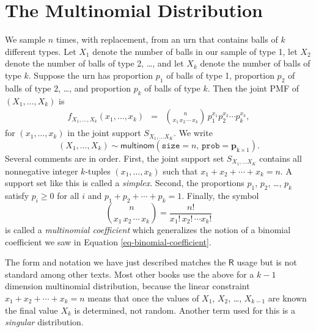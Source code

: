 \section{The Multinomial Distribution}
\label{sec-7-9}

We sample \(n\) times, with replacement, from an urn that contains
balls of \(k\) different types. Let \(X_{1}\) denote the number of
balls in our sample of type 1, let \(X_{2}\) denote the number of
balls of type 2, \ldots{}, and let \(X_{k}\) denote the number of balls of
type \(k\). Suppose the urn has proportion \(p_{1}\) of balls of type
1, proportion \(p_{2}\) of balls of type 2, \ldots{}, and proportion
\(p_{k}\) of balls of type \(k\). Then the joint PMF of
\((X_{1},\ldots,X_{k})\) is
\begin{eqnarray}
f_{X_{1},\ldots,X_{k}}(x_{1},\ldots,x_{k}) & = & {n \choose x_{1}\, x_{2}\,\cdots\, x_{k}}\, p_{1}^{x_{1}}p_{2}^{x_{2}}\cdots p_{k}^{x_{k}},
\end{eqnarray}
for \((x_{1},\ldots,x_{k})\) in the joint support \(S_{X_{1},\ldots X_{K}}\). We write
\begin{equation}
(X_{1},\ldots,X_{k})\sim\mathsf{multinom}(\mathtt{size}=n,\,\mathtt{prob}=\mathbf{p}_{\mathrm{k}\times1}).
\end{equation}
Several comments are in order. First, the joint support set
\(S_{X_{1},\ldots X_{K}}\) contains all nonnegative integer
\(k\)-tuples \((x_{1},\ldots,x_{k})\) such that
\(x_{1}+x_{2}+\cdots+x_{k}=n\). A support set like this is called a
\emph{simplex}. Second, the proportions \(p_{1}\), \(p_{2}\), \ldots{},
\(p_{k}\) satisfy \(p_{i}\geq0\) for all \(i\) and
\(p_{1}+p_{2}+\cdots+p_{k}=1\). Finally, the symbol
\begin{equation}
{n \choose x_{1}\, x_{2}\,\cdots\, x_{k}}=\frac{n!}{x_{1}!\, x_{2}!\,\cdots x_{k}!}
\end{equation}
is called a \emph{multinomial coefficient} which generalizes the notion of
a binomial coefficient we saw in Equation
\eqref{eq-binomial-coefficient}.

The form and notation we have just described matches the
\(\mathsf{R}\) usage but is not standard among other texts. Most other
books use the above for a \(k-1\) dimension multinomial distribution,
because the linear constraint \(x_{1}+x_{2}+\cdots+x_{k}=n\) means
that once the values of \(X_{1}\), \(X_{2}\), \ldots{}, \(X_{k-1}\) are
known the final value \(X_{k}\) is determined, not random. Another
term used for this is a \emph{singular} distribution.

